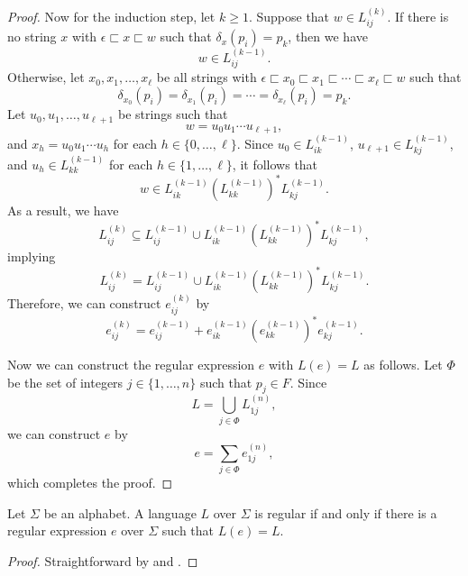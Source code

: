 \begin{proof}
  Now for the induction step, let $k \geq 1$.
  Suppose that $w \in L_{ij}^{(k)}$.
  If there is no string $x$ with $\epsilon \sqsubset x \sqsubset w$
  such that $\delta_x(p_i) = p_k$, then we have
  \begin{equation*}
    w \in L_{ij}^{(k-1)}.
  \end{equation*}
  Otherwise, let $x_0, x_1, \dots, x_\ell$ be all strings with
  $\epsilon \sqsubset x_0 \sqsubset x_1 \sqsubset \cdots \sqsubset x_\ell
  \sqsubset w$ such that
  \begin{equation*}
    \delta_{x_0}(p_i)
    = \delta_{x_1}(p_i)
    = \cdots
    = \delta_{x_\ell}(p_i)
    = p_k.
  \end{equation*}
  Let $u_0, u_1, \dots, u_{\ell+1}$ be strings such that
  \begin{equation*}
    w = u_0u_1 \cdots u_{\ell+1},
  \end{equation*}
  and $x_h = u_0u_1 \cdots u_h$ for each $h \in \{0, \dots, \ell\}$.
  Since $u_0 \in L_{ik}^{(k-1)}$, $u_{\ell+1} \in L_{kj}^{(k-1)}$, and
  $u_h \in L_{kk}^{(k-1)}$ for each $h \in \{1, \dots, \ell\}$,
  it follows that
  \begin{equation*}
    w \in L_{ik}^{(k-1)}\left(L_{kk}^{(k-1)}\right)^*L_{kj}^{(k-1)}.
  \end{equation*}
  As a result, we have
  \begin{equation*}
    L_{ij}^{(k)} \subseteq L_{ij}^{(k-1)} \cup
    L_{ik}^{(k-1)}\left(L_{kk}^{(k-1)}\right)^*L_{kj}^{(k-1)},
  \end{equation*}
  implying
  \begin{equation*}
    L_{ij}^{(k)} = L_{ij}^{(k-1)} \cup
    L_{ik}^{(k-1)}\left(L_{kk}^{(k-1)}\right)^*L_{kj}^{(k-1)}.
  \end{equation*}
  Therefore, we can construct $e_{ij}^{(k)}$ by
  \begin{equation*}
    e_{ij}^{(k)} = e_{ij}^{(k-1)}
    + e_{ik}^{(k-1)}\left(e_{kk}^{(k-1)}\right)^*e_{kj}^{(k-1)}.
  \end{equation*}

  Now we can construct the regular expression $e$ with $L(e) = L$ as follows.
  Let $\Phi$ be the set of integers $j \in \{1, \dots, n\}$ such that
  $p_j \in F$.
  Since
  \begin{equation*}
    L = \bigcup_{j \in \Phi} L_{1j}^{(n)},
  \end{equation*}
  we can construct $e$ by
  \begin{equation*}
    e = \sum_{j \in \Phi} e_{1j}^{(n)},
  \end{equation*}
  which completes the proof.
\end{proof}

\begin{theorem}
  Let $\Sigma$ be an alphabet.
  A language $L$ over $\Sigma$ is regular if and only if there is a regular
  expression $e$ over $\Sigma$ such that $L(e) = L$.
\end{theorem}
\begin{proof}
  Straightforward by  and
  .
\end{proof}